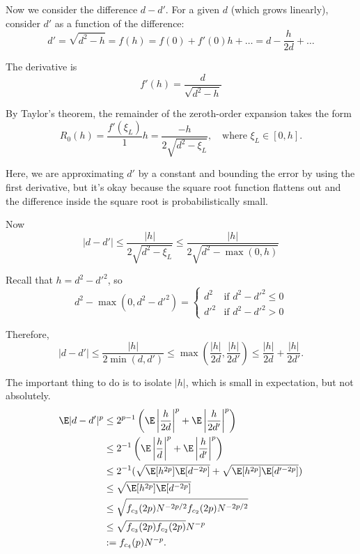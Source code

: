 Now we consider the difference $d-d'$.  For a given $d$ (which grows
linearly), consider $d'$ as a function of the difference:
\begin{equation*}
  d' = \sqrt{d^2-h} = f(h) = f(0) + f'(0) h + \ldots = d -
  \frac{h}{2d} + \ldots
\end{equation*}

The derivative is
\begin{equation*}
  f'(h) = \frac{d}{\sqrt{d^2-h}}
\end{equation*}

By Taylor's theorem, the remainder of the zeroth-order expansion takes
the form 
\begin{equation*}
  R_0(h) = \frac{f'(\xi_L)}{1}h = \frac{-h}{2\sqrt{d^2-\xi_L}}, \quad
  \text{where } \xi_L \in [0, h].
\end{equation*}

Here, we are approximating $d'$ by a constant and bounding the error
by using the first derivative, but it's okay because the square root
function flattens out and the difference inside the square root is
probabilistically small.

Now
\begin{equation*}
  |d-d'| \leq \frac{|h|}{2\sqrt{d^2-\xi_L}} \leq
  \frac{|h|}{2\sqrt{d^2-\max(0, h)}}
\end{equation*}

Recall that $h = d^2 - d'^2$, so 
\[
d^2-\max(0, d^2-d'^2) = 
\begin{cases}
  d^2 & \text{if } d^2-d'^2 \leq 0 \\
  d'^2 & \text{if } d^2-d'^2 > 0
\end{cases}
\]

Therefore, 
\begin{equation*}
  |d-d'| \leq \frac{|h|}{2\min(d, d')} \leq \max \left (
    \frac{|h|}{2d}, \frac{|h|}{2d'} \right ) \leq 
  \frac{|h|}{2d} +  \frac{|h|}{2d'}.
\end{equation*}

The important thing to do is to isolate $|h|$, which is small in
expectation, but not absolutely.
\begin{align}
  \E |d-d'|^p 
  &\leq 2^{p-1} \left ( \E \left | \frac{h}{2d} \right |^p + \E \left |
      \frac{h}{2d'} \right |^p \right ) \nonumber \\
  &\leq 2^{-1} \left ( \E \left | \frac{h}{d} \right |^p + \E \left |
      \frac{h}{d'} \right |^p \right ) \nonumber \\
  &\leq 2^{-1} ( \sqrt{\E[h^{2p}]\E[d^{-2p}]} +
  \sqrt{\E[h^{2p}]\E[d'^{-2p}]} ) \nonumber \\
  &\leq \sqrt{\E[h^{2p}]\E[d^{-2p}]} \nonumber \\
  &\leq \sqrt{f_{c_3}(2p)N^{-2p/2} f_{c_2}(2p) N^{-2p/2}} \nonumber \\
  &\leq \sqrt{f_{c_3}(2p) f_{c_2}(2p)} N^{-p} \nonumber \\
  &:= f_{c_4}(p) N^{-p} \label{def:ddiffp}.
\end{align}

